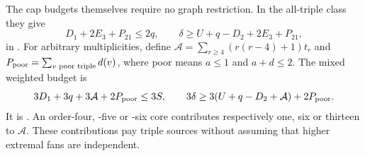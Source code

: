 The cap budgets themselves require no graph restriction. In the
all-triple class they give
\[
 D_1+2E_3+P_{21}\le2q,\qquad
 \delta\ge U+q-D_2+2E_3+P_{21},
\]
in .
For arbitrary multiplicities, define
$\mathcal A=\sum_{r\ge4}(r(r-4)+1)t_r$ and
$P_{\rm poor}=\sum_{v\text{ poor triple}}d(v)$, where poor means
$a\le1$ and $a+d\le2$. The mixed weighted budget is
\[
 3D_1+3q+3\mathcal A+2P_{\rm poor}\le3S,\qquad
 3\delta\ge3(U+q-D_2+\mathcal A)+2P_{\rm poor}.
\]
It is .
An order-four, -five or -six core contributes respectively one, six
or thirteen to $\mathcal A$. These contributions pay triple sources
without assuming that higher extremal fans are independent.

